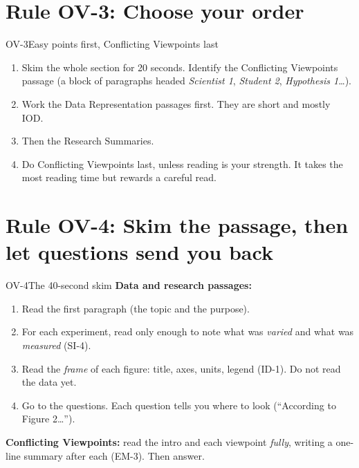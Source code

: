 \documentclass[11pt]{article}
\begin{document}

\section{Rule OV-3: Choose your order}

\begin{rulebox}{OV-3}{Easy points first, Conflicting Viewpoints last}
\begin{enumerate}
\item Skim the whole section for 20 seconds. Identify the Conflicting Viewpoints passage (a block of paragraphs headed \emph{Scientist 1}, \emph{Student 2}, \emph{Hypothesis 1}\ldots).
\item Work the Data Representation passages first. They are short and mostly IOD.
\item Then the Research Summaries.
\item Do Conflicting Viewpoints last, unless reading is your strength. It takes the most reading time but rewards a careful read.
\end{enumerate}
\end{rulebox}

\section{Rule OV-4: Skim the passage, then let questions send you back}

\begin{rulebox}{OV-4}{The 40-second skim}
\textbf{Data and research passages:}
\begin{enumerate}
\item Read the first paragraph (the topic and the purpose).
\item For each experiment, read only enough to note what was \emph{varied} and what was \emph{measured} (SI-4).
\item Read the \emph{frame} of each figure: title, axes, units, legend (ID-1). Do not read the data yet.
\item Go to the questions. Each question tells you where to look (``According to Figure 2\ldots'').
\end{enumerate}
\textbf{Conflicting Viewpoints:} read the intro and each viewpoint \emph{fully}, writing a one-line summary after each (EM-3). Then answer.
\end{rulebox}
\end{document}
